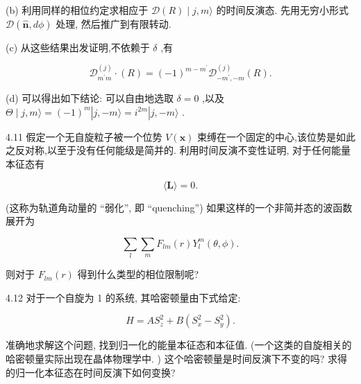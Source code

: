 (b) 利用同样的相位约定求相应于 $\mathcal{D}\left( R\right) \mid j, m\rangle$ 的时间反演态. 先用无穷小形式 $\mathcal{D}\left( {\widehat{\mathbf{n}},{d\phi }}\right)$ 处理, 然后推广到有限转动.

(c) 从这些结果出发证明,不依赖于 $\delta$ ,有

$$
{\mathcal{D}}_{{m}^{\prime }m}^{\left( j\right) } \cdot \left( R\right) = {\left( -1\right) }^{m - {m}^{\prime }}{\mathcal{D}}_{-{m}^{\prime }, - m}^{\left( j\right) }\left( R\right) .
$$

(d) 可以得出如下结论: 可以自由地选取 $\delta = 0$ ,以及 $\Theta \mid j, m\rangle = {\left( -1\right) }^{m}\left| {j, - m\rangle = {i}^{2m}}\right| j, - m\rangle$ .

4.11 假定一个无自旋粒子被一个位势 $V\left( \mathbf{x}\right)$ 束缚在一个固定的中心,该位势是如此之反对称,以至于没有任何能级是简并的. 利用时间反演不变性证明, 对于任何能量本征态有

$$
\langle \mathbf{L}\rangle = 0.
$$

(这称为轨道角动量的 “弱化”, 即 “quenching”) 如果这样的一个非简并态的波函数展开为

$$
\mathop{\sum }\limits_{l}\mathop{\sum }\limits_{m}{F}_{lm}\left( r\right) {Y}_{l}^{m}\left( {\theta ,\phi }\right) .
$$

则对于 ${F}_{lm}\left( r\right)$ 得到什么类型的相位限制呢?

4.12 对于一个自旋为 1 的系统, 其哈密顿量由下式给定:

$$
H = A{S}_{z}^{2} + B\left( {{S}_{x}^{2} - {S}_{y}^{2}}\right) .
$$

准确地求解这个问题, 找到归一化的能量本征态和本征值. (一个这类的自旋相关的哈密顿量实际出现在晶体物理学中. ) 这个哈密顿量是时间反演下不变的吗? 求得的归一化本征态在时间反演下如何变换?



	
	
	
	
	
\ifx\allfiles\undefined

	\else
	\fi
